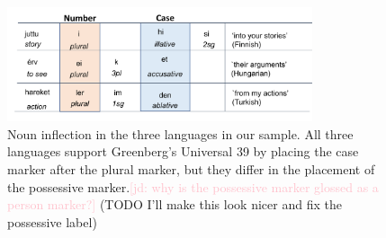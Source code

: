 \documentclass[11pt,letterpaper]{article}
\newcommand\mhahn[1]{{\color{red}(#1)}}
\newcommand{\jd}[1]{\textcolor{Pink}{[jd: #1]}}
\begin{document}


\begin{figure}
\includegraphics[width=0.8\textwidth]{figures/noun-morphemes.pdf}


\caption{Noun inflection in the three languages in our sample. All three languages support Greenberg's Universal 39 by placing the case marker after the plural marker, but they differ in the placement of the possessive marker.\jd{why is the possessive marker glossed as a person marker?} \mhahn{TODO I'll make this look nicer and fix the possessive label}}\label{fig:noun-inflection}
\end{figure}
\end{document}
